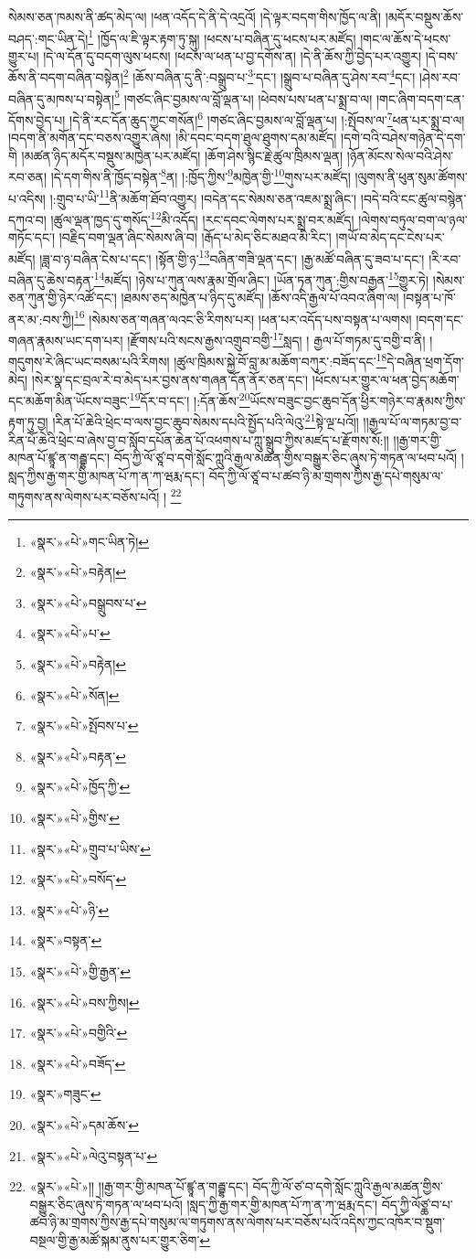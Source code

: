 \documentclass[12pt,a4paper]{book}
\begin{document}
སེམས་ཅན་ཁམས་ནི་ཚད་མེད་ལ། །ཕན་འདོད་དེ་ནི་དེ་འདྲའོ། །དེ་ལྟར་བདག་གིས་ཁྱོད་ལ་ནི། །མདོར་བསྡུས་ཆོས་བཤད་:གང་ཡིན་དེ།\footnote{«སྣར་»«པེ་»གང་ཡིན་ཏེ།} །ཁྱོད་ལ་ཇི་ལྟར་རྟག་ཏུ་སྐུ། །ཕངས་པ་བཞིན་དུ་ཕངས་པར་མཛོད། །གང་ལ་ཆོས་དེ་ཕངས་གྱུར་པ། །དེ་ལ་དོན་དུ་བདག་ལུས་ཕངས། །ཕངས་ལ་ཕན་པ་བྱ་དགོས་ན། །དེ་ནི་ཆོས་ཀྱི་བྱེད་པར་འགྱུར། །དེ་བས་ཆོས་ནི་བདག་བཞིན་བསྟེན།\footnote{«སྣར་»«པེ་»བརྟེན།} །ཆོས་བཞིན་དུ་ནི་:བསྒྲུབ་པ་\footnote{«སྣར་»«པེ་»བསྒྲུབས་པ་}་དང་། །སྒྲུབ་པ་བཞིན་དུ་ཤེས་རབ་\footnote{«སྣར་»«པེ་»པ་}དང་། །ཤེས་རབ་བཞིན་དུ་མཁས་པ་བསྟེན།\footnote{«སྣར་»«པེ་»བརྟེན།} །གཙང་ཞིང་བྱམས་ལ་བློ་ལྡན་པ། །ཕེབས་པས་ཕན་པ་སྨྲ་བ་ལ། །གང་ཞིག་བདག་ངན་དོགས་བྱེད་པ། །དེ་ནི་རང་དོན་ཆུད་ཀྱང་གསོན།\footnote{«སྣར་»«པེ་»སོན།} །གཙང་ཞིང་བྱམས་ལ་བློ་ལྡན་པ། །:སྤོབས་ལ་\footnote{«སྣར་»«པེ་»སྤོབས་པ་}ཕན་པར་སྨྲ་བ་ལ། །བདག་ནི་མགོན་དང་བཅས་འགྱུར་ཞེས། །མི་དབང་བདག་ཐུལ་ཐུགས་དམ་མཛོད། །དགེ་བའི་བཤེས་གཉེན་དེ་དག་གི །མཚན་ཉིད་མདོར་བསྡུས་མཁྱེན་པར་མཛོད། །ཆོག་ཤེས་སྙིང་རྗེ་ཚུལ་ཁྲིམས་ལྡན། །ཉོན་མོངས་སེལ་བའི་ཤེས་རབ་ཅན། །དེ་དག་གིས་ནི་ཁྱོད་བསྟེན་\footnote{«སྣར་»«པེ་»བརྟན་}ན། །:ཁྱོད་ཀྱིས་\footnote{«སྣར་»«པེ་»ཁྱོད་ཀྱི་}མཁྱེན་གྱི་\footnote{«སྣར་»«པེ་»གྱིས་}གུས་པར་མཛོད། །ལུགས་ནི་ཕུན་སུམ་ཚོགས་པ་འདིས། །:གྲུབ་པ་ཡི་\footnote{«སྣར་»«པེ་»གྲུབ་པ་ཡིས་}ནི་མཆོག་ཐོབ་འགྱུར། །བདེན་དང་སེམས་ཅན་འཇམ་སྨྲ་ཞིང་། །བདེ་བའི་ངང་ཚུལ་བསྙེན་དཀའ་བ། །ཚུལ་ལྡན་ཁྱད་དུ་གསོད་\footnote{«སྣར་»«པེ་»བསོད་}མི་འདོད། །རང་དབང་ལེགས་པར་སྨྲ་བར་མཛོད། །ལེགས་བཏུལ་བག་ལ་ཉལ་གཏོང་དང་། །བརྗིད་བག་ལྡན་ཞིང་སེམས་ཞི་བ། །རྒོད་པ་མེད་ཅིང་མཐའ་མི་རིང་། །གཡོ་བ་མེད་དང་ངེས་པར་མཛོད། །ཟླ་བ་ཉ་བཞིན་ངེས་པ་དང་། །སྟོན་གྱི་ཉ་\footnote{«སྣར་»«པེ་»ཉི་}བཞིན་གཟི་ལྡན་དང་། །རྒྱ་མཚོ་བཞིན་དུ་ཟབ་པ་དང་། །རི་རབ་བཞིན་དུ་ཆེས་བརྟན་\footnote{«སྣར་»བསྟན་}མཛོད། །ཉེས་པ་ཀུན་ལས་རྣམ་གྲོལ་ཞིང་། །ཡོན་ཏན་ཀུན་:གྱིས་བརྒྱན་\footnote{«སྣར་»«པེ་»གྱི་རྒྱན་}གྱུར་ཏེ། །སེམས་ཅན་ཀུན་གྱི་ཉེར་འཚོ་དང་། །ཐམས་ཅད་མཁྱེན་པ་ཉིད་དུ་མཛོད། །ཆོས་འདི་རྒྱལ་པོ་འབའ་ཞིག་ལ། །བསྟན་པ་ཁོ་ནར་མ་:བས་ཀྱི།\footnote{«སྣར་»«པེ་»བས་ཀྱིས།} །སེམས་ཅན་གཞན་ལའང་ཅི་རིགས་པར། །ཕན་པར་འདོད་པས་བསྟན་པ་ལགས། །བདག་དང་གཞན་རྣམས་ཡང་དག་པར། །རྫོགས་པའི་སངས་རྒྱས་འགྲུབ་བགྱི་\footnote{«སྣར་»«པེ་»བགྱིའི་}སླད། །
རྒྱལ་པོ་གཏམ་དུ་བགྱི་བ་ནི། །གདུགས་རེ་ཞིང་ཡང་བསམ་པའི་རིགས། །ཚུལ་ཁྲིམས་སྐྱེ་བོ་བླ་མ་མཆོག་བཀུར་:བཟོད་དང་\footnote{«སྣར་»«པེ་»བཟོད་}དེ་བཞིན་ཕྲག་དོག་མེད། །སེར་སྣ་དང་བྲལ་རེ་བ་མེད་པར་བྱས་ནས་གཞན་དོན་ནོར་ཅན་དང་། །ཕོངས་པར་གྱུར་ལ་ཕན་བྱེད་མཆོག་དང་མཆོག་མིན་ཡོངས་བཟུང་\footnote{«སྣར་»གཟུང་}དོར་བ་དང་། །:དོན་ཆོས་\footnote{«སྣར་»«པེ་»དམ་ཆོས་}ཡོངས་བཟུང་བྱང་ཆུབ་དོན་ཕྱིར་གཉེར་བ་རྣམས་ཀྱིས་རྟག་ཏུ་བྱ། །རིན་པོ་ཆེའི་ཕྲེང་བ་ལས་བྱང་ཆུབ་སེམས་དཔའི་སྤྱོད་པའི་ལེའུ་\footnote{«སྣར་»«པེ་»ལེའུ་བསྟན་པ་}སྟེ་ལྔ་པའོ།། །།རྒྱལ་པོ་ལ་གཏམ་བྱ་བ་རིན་པོ་ཆེའི་ཕྲེང་བ་ཞེས་བྱ་བ་སློབ་དཔོན་ཆེན་པོ་འཕགས་པ་ཀླུ་སྒྲུབ་ཀྱིས་མཛད་པ་རྫོགས་སོ:།། །།རྒྱ་གར་གྱི་མཁན་པོ་ཛྙཱ་ན་གརྦྷ་དང་། བོད་ཀྱི་ལོ་ཙཱ་བ་དགེ་སློང་ཀླུའི་རྒྱལ་མཚན་གྱིས་བསྒྱུར་ཅིང་ཞུས་ཏེ་གཏན་ལ་ཕབ་པའོ། །སླད་ཀྱིས་རྒྱ་གར་གྱི་མཁན་པོ་ཀ་ན་ཀ་ཝརྨ་དང་། བོད་ཀྱི་ལོ་ཙཱ་བ་པ་ཚབ་ཉི་མ་གྲགས་ཀྱིས་རྒྱ་དཔེ་གསུམ་ལ་གཏུགས་ནས་ལེགས་པར་བཅོས་པའོ། ། \footnote{«སྣར་»«པེ་»།། །།རྒྱ་གར་གྱི་མཁན་པོ་ཛྙཱ་ན་གརྦྷ་དང་། བོད་ཀྱི་ལོ་ཙ་བ་དགེ་སློང་ཀླུའི་རྒྱལ་མཚན་གྱིས་བསྒྱུར་ཅིང་ཞུས་ཏེ་གཏན་ལ་ཕབ་པའོ། །སླད་ཀྱི་རྒྱ་གར་གྱི་མཁན་པོ་ཀ་ན་ཀ་ཝརྨ་དང་། བོད་ཀྱི་ལོཙྖ་བ་པ་ཚབ་ཉི་མ་གྲགས་ཀྱིས་རྒྱ་དཔེ་གསུམ་ལ་གཏུགས་ནས་ལེགས་པར་བཅོས་པའོ་འདིས་ཀྱང་འཁོར་བ་སྡུག་བསྔལ་གྱི་རྒྱ་མཚོ་སྐམ་ནུས་པར་གྱུར་ཅིག་}
\end{document}
